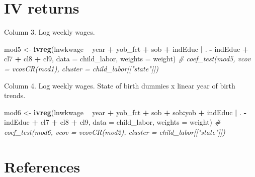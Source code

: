 \documentclass[]{book}
\newenvironment{Shaded}{\begin{snugshade}}{\end{snugshade}}
\newcommand{\KeywordTok}[1]{\textcolor[rgb]{0.13,0.29,0.53}{\textbf{#1}}}
\newcommand{\DataTypeTok}[1]{\textcolor[rgb]{0.13,0.29,0.53}{#1}}
\newcommand{\StringTok}[1]{\textcolor[rgb]{0.31,0.60,0.02}{#1}}
\newcommand{\CommentTok}[1]{\textcolor[rgb]{0.56,0.35,0.01}{\textit{#1}}}
\newcommand{\OperatorTok}[1]{\textcolor[rgb]{0.81,0.36,0.00}{\textbf{#1}}}
\newcommand{\NormalTok}[1]{#1}
\theoremstyle{definition}
\theoremstyle{definition}
\theoremstyle{definition}
\theoremstyle{remark}
\begin{document}
\section{IV returns}\label{iv-returns}

Column 3. Log weekly wages.

\begin{Shaded}
\begin{Highlighting}[]
\NormalTok{mod5 <-}\StringTok{ }\KeywordTok{ivreg}\NormalTok{(lnwkwage }\OperatorTok{~}\StringTok{ }\NormalTok{year }\OperatorTok{+}\StringTok{ }\NormalTok{yob_fct }\OperatorTok{+}\StringTok{ }\NormalTok{sob }\OperatorTok{+}\StringTok{ }\NormalTok{indEduc }\OperatorTok{|}
\StringTok{               }\NormalTok{. }\OperatorTok{-}\StringTok{ }\NormalTok{indEduc }\OperatorTok{+}\StringTok{ }\NormalTok{cl7 }\OperatorTok{+}\StringTok{ }\NormalTok{cl8 }\OperatorTok{+}\StringTok{ }\NormalTok{cl9,}
              \DataTypeTok{data =}\NormalTok{ child_labor, }\DataTypeTok{weights =}\NormalTok{ weight)}
\CommentTok{# coef_test(mod5, vcov = vcovCR(mod1), cluster = child_labor[["state"]])}
\end{Highlighting}
\end{Shaded}

Column 4. Log weekly wages. State of birth dummies x linear year of
birth trends.

\begin{Shaded}
\begin{Highlighting}[]
\NormalTok{mod6 <-}\StringTok{ }\KeywordTok{ivreg}\NormalTok{(lnwkwage }\OperatorTok{~}\StringTok{ }\NormalTok{year }\OperatorTok{+}\StringTok{ }\NormalTok{yob_fct }\OperatorTok{+}\StringTok{ }\NormalTok{sob }\OperatorTok{+}\StringTok{ }\NormalTok{sob}\OperatorTok{:}\NormalTok{yob }\OperatorTok{+}\StringTok{ }\NormalTok{indEduc }\OperatorTok{|}
\StringTok{               }\NormalTok{. }\OperatorTok{-}\StringTok{ }\NormalTok{indEduc }\OperatorTok{+}\StringTok{ }\NormalTok{cl7 }\OperatorTok{+}\StringTok{ }\NormalTok{cl8 }\OperatorTok{+}\StringTok{ }\NormalTok{cl9,}
              \DataTypeTok{data =}\NormalTok{ child_labor, }\DataTypeTok{weights =}\NormalTok{ weight)}
\CommentTok{# coef_test(mod6, vcov = vcovCR(mod2), cluster = child_labor[["state"]])}
\end{Highlighting}
\end{Shaded}

\section*{References}\label{references-7}
\end{document}
